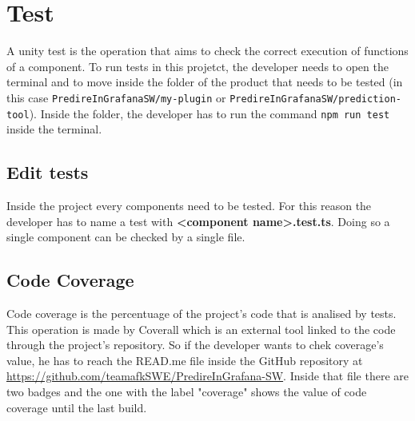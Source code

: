 \section{Test}
A unity test is the operation that aims to check the correct execution of functions of a component.
To run tests in this projetct, the developer needs to open the terminal and to move inside the folder of the product that needs to be tested (in this case \texttt{PredireInGrafanaSW/my-plugin} or \texttt{PredireInGrafanaSW/prediction-tool}). Inside the folder, the developer has to run the command \texttt{npm run test} inside the terminal. 
\subsection{Edit tests}
Inside the project every components need to be tested. For this reason the developer has to name a test with \textbf{<component name>.test.ts}. Doing so a single component can be checked by a single file.
\subsection{Code Coverage}
Code coverage is the percentuage of the project's code that is analised by tests. This operation is made by Coverall which is an external tool linked to the code through the project's repository. So if the developer wants to chek coverage's value, he has to reach the READ.me file inside the GitHub repository at \url{https://github.com/teamafkSWE/PredireInGrafana-SW}. Inside that file there are two badges and the one with the label "coverage" shows the value of code coverage until the last build.